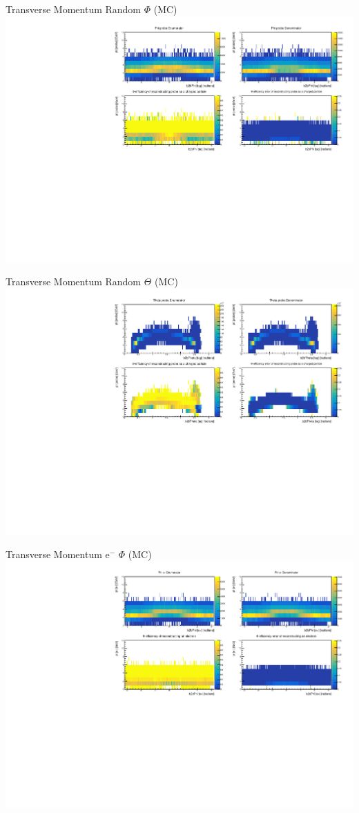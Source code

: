 \documentclass[10pt]{beamer}
\begin{document}
\begin{frame}{Transverse Momentum Random $\Phi$ (MC)}
	\centering
	\includegraphics[width=\textwidth]{Momentum/tMPhiRandom_MC}
\end{frame}


\begin{frame}{Transverse Momentum Random $\Theta$ (MC)}
	\centering
	\includegraphics[width=\textwidth]{Momentum/tMThetaRandom_MC}
\end{frame}
\begin{frame}{Transverse Momentum $\textrm{e}^-$ $\Phi$ (MC)}
	\centering
	\includegraphics[width=\textwidth]{Momentum/tMPhiem_MC}
\end{frame}
\end{document}
